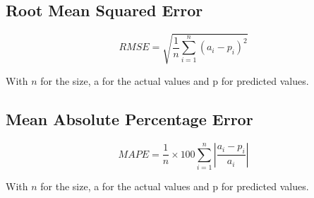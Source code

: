 \subsection{Root Mean Squared Error}

\begin{equation}
RMSE = \sqrt{\frac{1}{n} \sum_{i=1}^{n} (a_i-p_i)^2}
\end{equation}

With $n$ for the size, a for the actual values and p for predicted values.\\

\subsection{Mean Absolute Percentage Error}

\begin{equation}
MAPE = \frac{1}{n}\times 100 \sum_{i=1}^{n} \left|\frac{a_i-p_i}{a_i}\right|
\end{equation}

With $n$ for the size, a for the actual values and p for predicted values.\\





%
%
%

